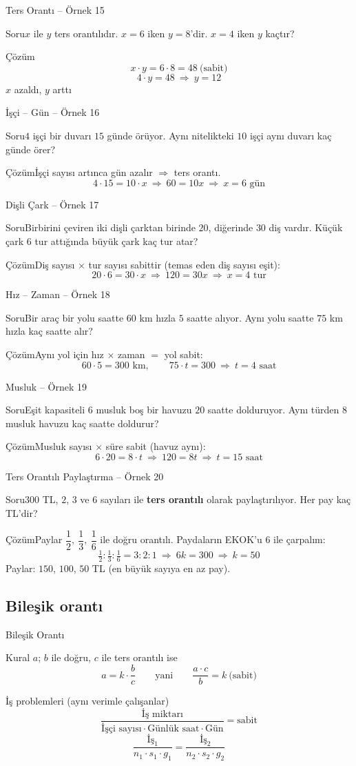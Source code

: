 \documentclass[aspectratio=169,11pt]{beamer}
\newcommand{\soru}[3]{%
\begin{frame}{#1}
  \begin{block}{Soru}\large #2\end{block}
  \pause
  \begin{exampleblock}{Çözüm}\large #3\end{exampleblock}
\end{frame}}
\begin{document}
\soru{Ters Orantı -- Örnek 15}
{\(x\) ile \(y\) ters orantılıdır. \(x=6\) iken \(y=8\)'dir. \(x=4\) iken \(y\) kaçtır?}
{\[x\cdot y=6\cdot 8=48\ \text{(sabit)}\]
\[4\cdot y=48\ \Rightarrow\ y=12\]
\(x\) azaldı, \(y\) arttı \checkmark}

\soru{İşçi -- Gün -- Örnek 16}
{\(4\) işçi bir duvarı \(15\) günde örüyor. Aynı nitelikteki \(10\) işçi aynı duvarı kaç günde örer?}
{İşçi sayısı artınca gün azalır \(\Rightarrow\) ters orantı.
\[4\cdot 15=10\cdot x\ \Rightarrow\ 60=10x\ \Rightarrow\ x=6\text{ gün}\]}

\soru{Dişli Çark -- Örnek 17}
{Birbirini çeviren iki dişli çarktan birinde \(20\), diğerinde \(30\) diş vardır. Küçük çark \(6\) tur attığında büyük çark kaç tur atar?}
{Diş sayısı \(\times\) tur sayısı sabittir (temas eden diş sayısı eşit):
\[20\cdot 6=30\cdot x\ \Rightarrow\ 120=30x\ \Rightarrow\ x=4\text{ tur}\]}

\soru{Hız -- Zaman -- Örnek 18}
{Bir araç bir yolu saatte \(60\) km hızla \(5\) saatte alıyor. Aynı yolu saatte \(75\) km hızla kaç saatte alır?}
{Aynı yol için hız \(\times\) zaman \(=\) yol sabit:
\[60\cdot 5=300\text{ km},\qquad 75\cdot t=300\ \Rightarrow\ t=4\text{ saat}\]}

\soru{Musluk -- Örnek 19}
{Eşit kapasiteli \(6\) musluk boş bir havuzu \(20\) saatte dolduruyor. Aynı türden \(8\) musluk havuzu kaç saatte doldurur?}
{Musluk sayısı \(\times\) süre sabit (havuz aynı):
\[6\cdot 20=8\cdot t\ \Rightarrow\ 120=8t\ \Rightarrow\ t=15\text{ saat}\]}

\soru{Ters Orantılı Paylaştırma -- Örnek 20}
{\(300\) TL, \(2\), \(3\) ve \(6\) sayıları ile \textbf{ters orantılı} olarak paylaştırılıyor. Her pay kaç TL'dir?}
{Paylar \(\dfrac{1}{2},\ \dfrac{1}{3},\ \dfrac{1}{6}\) ile doğru orantılı. Paydaların EKOK'u \(6\) ile çarpalım:
\[\tfrac{1}{2}:\tfrac{1}{3}:\tfrac{1}{6}=3:2:1\ \Rightarrow\ 6k=300\ \Rightarrow\ k=50\]
Paylar: \(150\), \(100\), \(50\) TL (en büyük sayıya en az pay).}

\subsection{Bileşik orantı}
\begin{frame}{Bileşik Orantı}
\begin{block}{Kural}
\(a\); \(b\) ile doğru, \(c\) ile ters orantılı ise
\[a=k\cdot\frac{b}{c}\qquad\text{yani}\qquad \frac{a\cdot c}{b}=k\ \text{(sabit)}\]
\end{block}
\begin{block}{İş problemleri (aynı verimle çalışanlar)}
\[\frac{\text{İş miktarı}}{\text{İşçi sayısı}\cdot\text{Günlük saat}\cdot\text{Gün}}=\text{sabit}\]
\[\frac{\text{İş}_1}{n_1\cdot s_1\cdot g_1}=\frac{\text{İş}_2}{n_2\cdot s_2\cdot g_2}\]
\end{block}
\end{frame}
\end{document}
